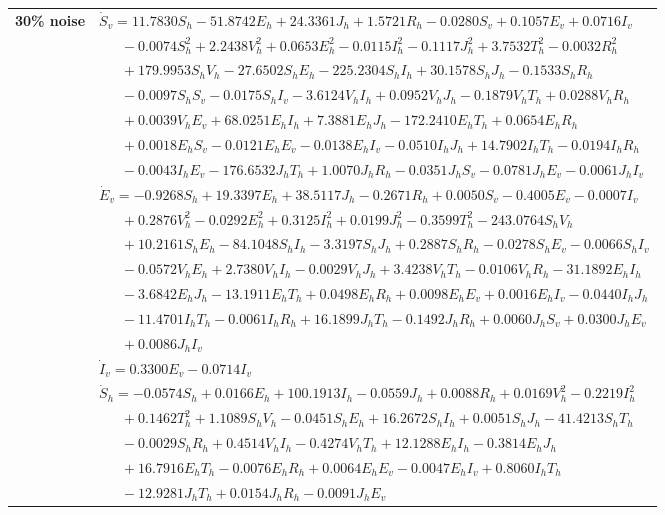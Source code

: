 \documentclass[9pt]{article}
\numberwithin{equation}{section}
\begin{document}
\begin{table}[ht]
\begin{tabularx}{1\linewidth}{|l|X|}
        \textbf{30\% noise} & $\dot{S}_v=11.7830S_h-51.8742E_h+24.3361J_h+1.5721R_h-0.0280S_v+0.1057E_v+0.0716I_v$ \\
        & $\quad\;\;-0.0074S_h^2+2.2438V_h^2+0.0653E_h^2-0.0115I_h^2-0.1117J_h^2+3.7532T_h^2-0.0032R_h^2$ \\
        & $\quad\;\;+179.9953S_hV_h-27.6502S_hE_h-225.2304S_hI_h+30.1578S_hJ_h-0.1533S_hR_h$ \\
        & $\quad\;\;-0.0097S_hS_v-0.0175S_hI_v-3.6124V_hI_h+0.0952V_hJ_h-0.1879V_hT_h+0.0288V_hR_h$ \\
        & $\quad\;\;+0.0039V_hE_v+68.0251E_hI_h+7.3881E_hJ_h-172.2410E_hT_h+0.0654E_hR_h$ \\
        & $\quad\;\;+0.0018E_hS_v-0.0121E_hE_v-0.0138E_hI_v-0.0510I_hJ_h+14.7902I_hT_h-0.0194I_hR_h$ \\
        & $\quad\;\;-0.0043I_hE_v-176.6532J_hT_h+1.0070J_hR_h-0.0351J_hS_v-0.0781J_hE_v-0.0061J_hI_v$ \\
        & $\dot{E}_v=-0.9268S_h+19.3397E_h+38.5117J_h-0.2671R_h+0.0050S_v-0.4005E_v-0.0007I_v$ \\
        & $\quad\;\;+0.2876V_h^2-0.0292E_h^2+0.3125I_h^2+0.0199J_h^2-0.3599T_h^2-243.0764S_hV_h$ \\
        & $\quad\;\;+10.2161S_hE_h-84.1048S_hI_h-3.3197S_hJ_h+0.2887S_hR_h-0.0278S_hE_v-0.0066S_hI_v$ \\
        & $\quad\;\;-0.0572V_hE_h+2.7380V_hI_h-0.0029V_hJ_h+3.4238V_hT_h-0.0106V_hR_h-31.1892E_hI_h$ \\
        & $\quad\;\;-3.6842E_hJ_h-13.1911E_hT_h+0.0498E_hR_h+0.0098E_hE_v+0.0016E_hI_v-0.0440I_hJ_h$ \\
        & $\quad\;\;-11.4701I_hT_h-0.0061I_hR_h+16.1899J_hT_h-0.1492J_hR_h+0.0060J_hS_v+0.0300J_hE_v$ \\
        & $\quad\;\;+0.0086J_hI_v$ \\
        & $\dot{I}_v=0.3300E_v-0.0714I_v$ \\
        \hline\hline
        & $\dot{S}_h=-0.0574S_h+0.0166E_h+100.1913I_h-0.0559J_h+0.0088R_h+0.0169V_h^2-0.2219I_h^2$ \\
        & $\quad\;\;+0.1462T_h^2+1.1089S_hV_h-0.0451S_hE_h+16.2672S_hI_h+0.0051S_hJ_h-41.4213S_hT_h$ \\
        & $\quad\;\;-0.0029S_hR_h+0.4514V_hI_h-0.4274V_hT_h+12.1288E_hI_h-0.3814E_hJ_h$ \\
        & $\quad\;\;+16.7916E_hT_h-0.0076E_hR_h+0.0064E_hE_v-0.0047E_hI_v+0.8060I_hT_h$ \\
        & $\quad\;\;-12.9281J_hT_h+0.0154J_hR_h-0.0091J_hE_v$ \\

\end{tabularx}
\end{table}
\end{document}
